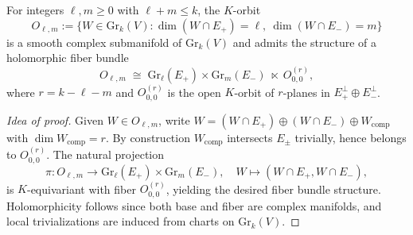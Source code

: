 \documentclass[10pt,a4paper]{amsart}
\begin{document}
\begin{proposition}
For integers $\ell,m \geq 0$ with $\ell+m \leq k$, the $K$-orbit
\[
O_{\ell,m} := \{ W \in \mathrm{Gr}_k(V) : 
\dim(W \cap E_+) = \ell, \ \dim(W \cap E_-) = m \}
\]
is a smooth complex submanifold of $\mathrm{Gr}_k(V)$ and admits the structure 
of a holomorphic fiber bundle
\[
O_{\ell,m} \;\cong\; \mathrm{Gr}_\ell(E_+) \times \mathrm{Gr}_m(E_-) 
\;\ltimes\; O^{(r)}_{0,0},
\]
where $r = k-\ell-m$ and $O^{(r)}_{0,0}$ is the open $K$-orbit of $r$-planes 
in $E_+^\perp \oplus E_-^\perp$. 
\end{proposition}

\begin{proof}[Idea of proof]
Given $W \in O_{\ell,m}$, write 
$W = (W \cap E_+) \oplus (W \cap E_-) \oplus W_{\mathrm{comp}}$ 
with $\dim W_{\mathrm{comp}} = r$. 
By construction $W_{\mathrm{comp}}$ intersects $E_\pm$ trivially, hence 
belongs to $O^{(r)}_{0,0}$. 
The natural projection
\[
\pi : O_{\ell,m} \to \mathrm{Gr}_\ell(E_+) \times \mathrm{Gr}_m(E_-), 
\quad W \mapsto (W \cap E_+, W \cap E_-),
\]
is $K$-equivariant with fiber $O^{(r)}_{0,0}$, yielding the desired 
fiber bundle structure. 
Holomorphicity follows since both base and fiber are complex manifolds, 
and local trivializations are induced from charts on $\mathrm{Gr}_k(V)$. 
\end{proof}
\end{document}

